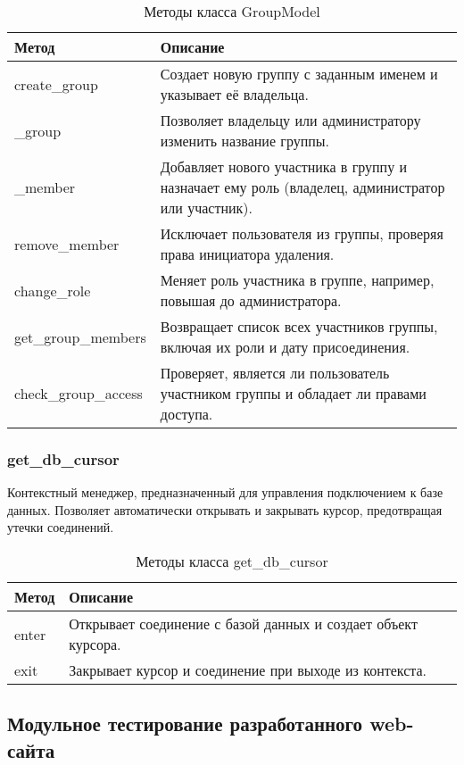 \begin{xltabular}{\textwidth}{|l|X|}
	\caption{Методы класса GroupModel}\\ \hline
	\centrow Метод & \centrow Описание \\ \hline
	create\_group & Создает новую группу с заданным именем и указывает её владельца. \\ \hline 
	\_group & Позволяет владельцу или администратору изменить название группы. \\ \hline 
	\_member & Добавляет нового участника в группу и назначает ему роль (владелец, администратор или участник). \\ \hline
	remove\_member & Исключает пользователя из группы, проверяя права инициатора удаления. \\ \hline
	change\_role & Меняет роль участника в группе, например, повышая до администратора. \\ \hline
	get\_group\_members & Возвращает список всех участников группы, включая их роли и дату присоединения. \\ \hline
	check\_group\_access & Проверяет, является ли пользователь участником группы и обладает ли правами доступа. \\ \hline
\end{xltabular}

\subsubsection{get\_db\_cursor}

Контекстный менеджер, предназначенный для управления подключением к базе данных. Позволяет автоматически открывать и закрывать курсор, предотвращая утечки соединений.

\begin{xltabular}{\textwidth}{|l|X|}
	\caption{Методы класса get\_db\_cursor}\\ \hline
	\centrow Метод & \centrow Описание \\ \hline
	enter & Открывает соединение с базой данных и создает объект курсора. \\ \hline
	exit & Закрывает курсор и соединение при выходе из контекста. \\ \hline
\end{xltabular}

\subsection{Модульное тестирование разработанного web-сайта}


